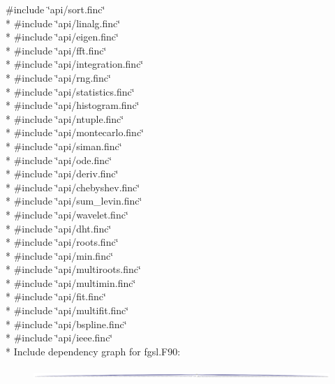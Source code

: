 {\ttfamily \#include \char`\"{}api/sort.\-finc\char`\"{}}\\*
{\ttfamily \#include \char`\"{}api/linalg.\-finc\char`\"{}}\\*
{\ttfamily \#include \char`\"{}api/eigen.\-finc\char`\"{}}\\*
{\ttfamily \#include \char`\"{}api/fft.\-finc\char`\"{}}\\*
{\ttfamily \#include \char`\"{}api/integration.\-finc\char`\"{}}\\*
{\ttfamily \#include \char`\"{}api/rng.\-finc\char`\"{}}\\*
{\ttfamily \#include \char`\"{}api/statistics.\-finc\char`\"{}}\\*
{\ttfamily \#include \char`\"{}api/histogram.\-finc\char`\"{}}\\*
{\ttfamily \#include \char`\"{}api/ntuple.\-finc\char`\"{}}\\*
{\ttfamily \#include \char`\"{}api/montecarlo.\-finc\char`\"{}}\\*
{\ttfamily \#include \char`\"{}api/siman.\-finc\char`\"{}}\\*
{\ttfamily \#include \char`\"{}api/ode.\-finc\char`\"{}}\\*
{\ttfamily \#include \char`\"{}api/deriv.\-finc\char`\"{}}\\*
{\ttfamily \#include \char`\"{}api/chebyshev.\-finc\char`\"{}}\\*
{\ttfamily \#include \char`\"{}api/sum\-\_\-levin.\-finc\char`\"{}}\\*
{\ttfamily \#include \char`\"{}api/wavelet.\-finc\char`\"{}}\\*
{\ttfamily \#include \char`\"{}api/dht.\-finc\char`\"{}}\\*
{\ttfamily \#include \char`\"{}api/roots.\-finc\char`\"{}}\\*
{\ttfamily \#include \char`\"{}api/min.\-finc\char`\"{}}\\*
{\ttfamily \#include \char`\"{}api/multiroots.\-finc\char`\"{}}\\*
{\ttfamily \#include \char`\"{}api/multimin.\-finc\char`\"{}}\\*
{\ttfamily \#include \char`\"{}api/fit.\-finc\char`\"{}}\\*
{\ttfamily \#include \char`\"{}api/multifit.\-finc\char`\"{}}\\*
{\ttfamily \#include \char`\"{}api/bspline.\-finc\char`\"{}}\\*
{\ttfamily \#include \char`\"{}api/ieee.\-finc\char`\"{}}\\*
Include dependency graph for fgsl.\-F90\-:\nopagebreak
\begin{figure}[H]
\begin{center}
\leavevmode
\includegraphics[width=350pt]{fgsl_8F90__incl}
\end{center}
\end{figure}
